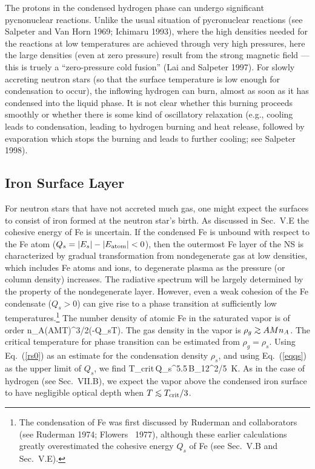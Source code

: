 The protons in the condensed hydrogen phase can undergo significant
pycnonuclear reactions. Unlike the usual situation of 
pycronuclear reactions (see Salpeter and Van Horn 1969; Ichimaru 1993),
where the high densities needed for the reactions at low temperatures
are achieved through very high pressures, here the large densities
(even at zero pressure) result from the strong magnetic field 
--- this is truely a ``zero-pressure cold fusion'' (Lai and Salpeter 1997). 
For slowly accreting neutron stars (so that the surface temperature is 
low enough for condensation to occur), the inflowing hydrogen can burn, 
almost as soon as it has condensed into the liquid phase. It is not clear
whether this burning proceeds smoothly or whether there is some kind of 
oscillatory relaxation (e.g., cooling leads to condensation,
leading to hydrogen burning and heat release, followed by evaporation
which stops the burning and leads to further cooling; see Salpeter 1998). 




\subsection{Iron Surface Layer}

For neutron stars that have not accreted much gas, one might expect 
the surfaces to consist of iron formed at the neutron star's birth.
As discussed in Sec.~V.E the cohesive energy of Fe is uncertain. 
If the condensed Fe is unbound with respect to the Fe atom ($Q_s=|E_s|-|E_{\rm
atom}|<0$), then the outermost Fe layer of the NS
is characterized by gradual transformation from
nondegenerate gas at low densities, which includes Fe atoms and ions,
to degenerate plasma as the pressure (or column
density) increases. The radiative spectrum will be largely determined by
the property of the nondegenerate layer. However, even a weak cohesion 
of the Fe condensate ($Q_s>0$) can give rise to a phase transition at
sufficiently low temperatures.\footnote{The condensation of Fe was
first discussed by Ruderman and collaborators (see Ruderman 1974;
Flowers \etal~1977), although these earlier calculations greatly overestimated
the cohesive energy $Q_s$ of Fe (see Sec.~V.B and Sec.~V.E).}
The number density of atomic Fe in the 
saturated vapor is of order 
\be
n_A\simeq \left({AMT\pi}\right)^{3/2}\exp\left(-{Q_s\over T}\right).
\ee
The gas density in the vapor is $\rho_g\go AMn_A$. The critical temperature
for phase transition can be estimated from $\rho_g=\rho_s$. 
Using Eq.~(\ref{rs0}) as an estimate for the condensation density $\rho_s$,
and using Eq.~(\ref{eqqs}) as the upper limit of $Q_s$, we find
\be
T_{\rm crit}\,Q_s^{5.5}\,B_{12}^{2/5}~{\rm K}.
\ee
As in the case of hydrogen (see Sec.~VII.B), we expect the vapor above the
condensed iron surface to have negligible optical depth when $T\lo T_{\rm
crit}/3$. 
 
